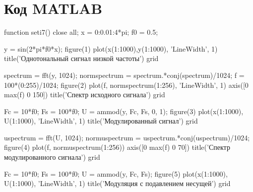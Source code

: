 \documentclass[10pt,a4paper]{report}
\begin{document}
\section{Код MATLAB}
function seti7() \newline
close all;\newline
x = 0:0.01:4*pi;\newline
f0 = 0.5;\newline

y = sin(2*pi*f0*x);\newline
figure(1)\newline
plot(x(1:1000),y(1:1000), 'LineWidth', 1)\newline
title('Однотональный сигнал низкой частоты')\newline
grid\newline

spectrum = fft(y, 1024);\newline
normspectrum = spectrum.*conj(spectrum)/1024;\newline
f = 100*(0:255)/1024;\newline
figure(2)\newline
plot(f, normspectrum(1:256), 'LineWidth', 1)\newline
axis([0 max(f) 0 150])\newline
title('Спектр исходного сигнала')\newline
grid\newline

Fc = 10*f0;\newline
Fs = 100*f0;\newline
U = ammod(y, Fc, Fs, 0, 1);\newline
figure(3)\newline
plot(x(1:1000), U(1:1000),  'LineWidth', 1)\newline
title('Модулированный сигнал')\newline
grid\newline

uspectrum = fft(U, 1024);\newline
normuspectrum = uspectrum.*conj(uspectrum)/1024;\newline
figure(4)\newline
plot(f, normuspectrum(1:256))\newline
axis([0 max(f) 0 70])\newline
title('Спектр модулированного сигнала')\newline
grid\newline

Fc = 10*f0;\newline
Fs = 100*f0;\newline
U = ammod(y, Fc, Fs);\newline
figure(5)\newline
plot(x(1:1000), U(1:1000), 'LineWidth', 1)\newline
title('Модуляция с подавлением несущей')\newline
grid\newline
\end{document}
